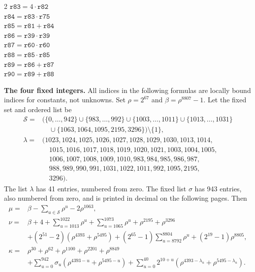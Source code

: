 \documentclass[10pt]{article}
\begin{document}
\begin{multicols}{2}
\(\mathtt{r83} = 4 \cdot \mathtt{r82}\)\\
\(\mathtt{r84} = \mathtt{r83} \cdot \mathtt{r75}\)\\
\(\mathtt{r85} = \mathtt{r81} + \mathtt{r84}\)\\
\(\mathtt{r86} = \mathtt{r39} \cdot \mathtt{r39}\)\\
\(\mathtt{r87} = \mathtt{r60} \cdot \mathtt{r60}\)\\
\(\mathtt{r88} = \mathtt{r85} \cdot \mathtt{r85}\)\\
\(\mathtt{r89} = \mathtt{r86} + \mathtt{r87}\)\\
\(\mathtt{r90} = \mathtt{r89} + \mathtt{r88}\)\\
\end{multicols}
\clearpage
\textbf{The four fixed integers.} All indices in the following formulas are
locally bound indices for constants, not unknowns. Set \(\rho=2^{67}\) and
\(\beta=\rho^{8807}-1\). Let the fixed set and ordered list be
\[
\begin{aligned}
\mathcal S={}&\bigl(\{0,\ldots,942\}\cup\{983,\ldots,992\}\cup
\{1003,\ldots,1011\}\cup\{1013,\ldots,1031\}\\
&\quad\cup\{1063,1064,1095,2195,3296\}\bigr)\setminus\{1\},\\
\lambda={}&(1023,1024,1025,1026,1027,1028,1029,1030,1013,1014,\\
&\quad 1015,1016,1017,1018,1019,1020,1021,1003,1004,1005,\\
&\quad 1006,1007,1008,1009,1010,983,984,985,986,987,\\
&\quad 988,989,990,991,1031,1022,1011,992,1095,2195,\\
&\quad 3296).
\end{aligned}
\]
The list \(\lambda\) has 41 entries, numbered from zero. The fixed list
\(\sigma\) has 943 entries, also numbered from zero, and is printed in
decimal on the following pages. Then
\[
\begin{aligned}
\mu={}&\beta-\sum_{u\in\mathcal S}\rho^u-2\rho^{1063},\\
\nu={}&\beta+4+\sum_{u=1013}^{1022}\rho^u+\sum_{u=1065}^{1073}\rho^u
 +\rho^{2195}+\rho^{3296}\\
&+(2^{51}-2)(\rho^{4393}+\rho^{5495})
 +(2^{65}-1)\sum_{u=8792}^{8804}\rho^u+(2^{19}-1)\rho^{8805},\\
\kappa={}&\rho^{30}+\rho^{62}+\rho^{1100}+\rho^{2201}+\rho^{8849}\\
&+\sum_{u=0}^{942}\sigma_u(\rho^{4393-u}+\rho^{5495-u})
 +\sum_{u=0}^{40}2^{10+u}(\rho^{4393-\lambda_u}+\rho^{5495-\lambda_u}).
\end{aligned}
\]
\end{document}
